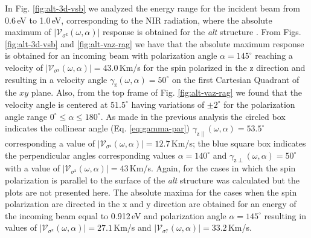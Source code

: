 \documentclass[prb,11pt,tightenlines,twocolumn,aps]{revtex4-1}
\begin{document}
In Fig. \ref{fig:alt-3d-vsb} we analyzed the energy range for the incident beam
from 0.6\,eV to 1.0\,eV, corresponding to the NIR radiation, where the absolute
maximum of $|\mathcal{V}_{\sigma^{\mathrm{z}}}(\omega,\alpha)|$ response is
obtained for the \emph{alt} structure .
% 
{\color{red} From Figs. \ref{fig:alt-3d-vsb} and \ref{fig:alt-vaz-rag} we have
that the absolute maximum response is obtained for an incoming beam with
polarization angle $\alpha=145^{\circ}$ reaching a velocity of
$|\mathcal{V}_{\sigma^{\mathrm{z}}}(\omega,\alpha)| = 43.0$\,Km/s for the spin
polarized in the $\mathrm{z}$ direction and resulting in a velocity angle
$\gamma_{\mathrm{z}}(\omega,\alpha)=50^{\circ}$ on the first Cartesian Quadrant
of the $xy$ plane.
% 
Also, from the top frame of Fig. \ref{fig:alt-vaz-rag} we found that the
velocity angle is centered at $51.5^{\circ}$ having variations of $\pm
2^{\circ}$ for the polarization angle range $0^{\circ} \leq
\alpha \leq 180^{\circ}$.
% 
As made in the previous analysis the circled box indicates the collinear angle
(Eq. \eqref{eq:gamma-par}) $\gamma_{\mathrm{z}\parallel}(\omega,\alpha) =
53.5^{\circ}$ corresponding a value of
$|\mathcal{V}_{\sigma^{\mathrm{z}}}(\omega,\alpha)| = 12.7$\,Km/s; the blue
square box indicates the perpendicular angles corresponding values
$\alpha=140^{\circ}$ and $\gamma_{\mathrm{z}\perp}(\omega,\alpha)=50^{\circ}$
with a value of $|\mathcal{V}_{\sigma^{\mathrm{z}}}(\omega,\alpha)|=43$\,Km/s.}
% 
Again, for the cases in which the spin polarization is parallel to the surface
of the \emph{alt} structure was calculated but the plots are not presented here.
The absolute maxima for the cases when the spin polarization are directed in the
$\mathrm{x}$ and $\mathrm{y}$ direction are obtained for an energy of the
incoming beam equal to 0.912\,eV and polarization angle $\alpha=145^{\circ}$
resulting in values of
$|\mathcal{V}_{\sigma^{\mathrm{x}}}(\omega,\alpha)|=27.1$\,Km/s and
$|\mathcal{V}_{\sigma^{\mathrm{y}}}(\omega,\alpha)|=33.2$\,Km/s.

\end{document}
